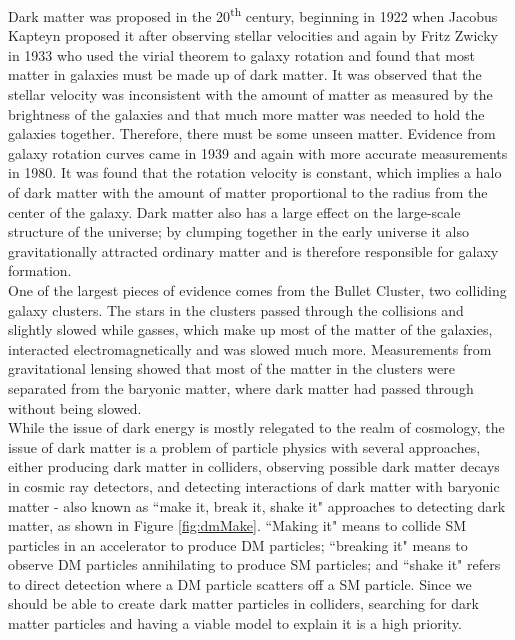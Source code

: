 Dark matter was proposed in the 20\textsuperscript{th} century, beginning in 1922 when Jacobus Kapteyn proposed it after observing stellar velocities\cite{dm1} and again by Fritz Zwicky in 1933 who used the virial theorem to galaxy rotation and found that most matter in galaxies must be made up of dark matter\cite{dm2}.  It was observed that the stellar velocity was inconsistent with the amount of matter as measured by the brightness of the galaxies and that much more matter was needed to hold the galaxies together.  Therefore, there must be some unseen matter.  Evidence from galaxy rotation curves came in 1939\cite{dm3} and again with more accurate measurements in 1980\cite{dm4}.  It was found that the rotation velocity is constant, which implies a halo of dark matter with the amount of matter proportional to the radius from the center of the galaxy.  Dark matter also has a large effect on the large-scale structure of the universe; by clumping together in the early universe it also gravitationally attracted ordinary matter and is therefore responsible for galaxy formation.  \\

One of the largest pieces of evidence comes from the Bullet Cluster\cite{bulletcluster}, two colliding galaxy clusters.  The stars in the clusters passed through the collisions and slightly slowed while gasses, which make up most of the matter of the galaxies, interacted electromagnetically and was slowed much more.  Measurements from gravitational lensing showed that most of the matter in the clusters were separated from the baryonic matter, where dark matter had passed through without being slowed.  \\

While the issue of dark energy is mostly relegated to the realm of cosmology, the issue of dark matter is a problem of particle physics with several approaches, either producing dark matter in colliders, observing possible dark matter decays in cosmic ray detectors, and detecting interactions of dark matter with baryonic matter - also known as ``make it, break it, shake it" approaches to detecting dark matter, as shown in Figure \ref{fig:dmMake}.  ``Making it" means to collide SM particles in an accelerator to produce DM particles; ``breaking it" means to observe DM particles annihilating to produce SM particles; and ``shake it" refers to direct detection where a DM particle scatters off a SM particle.  Since we should be able to create dark matter particles in colliders, searching for dark matter particles and having a viable model to explain it is a high priority.  \\


